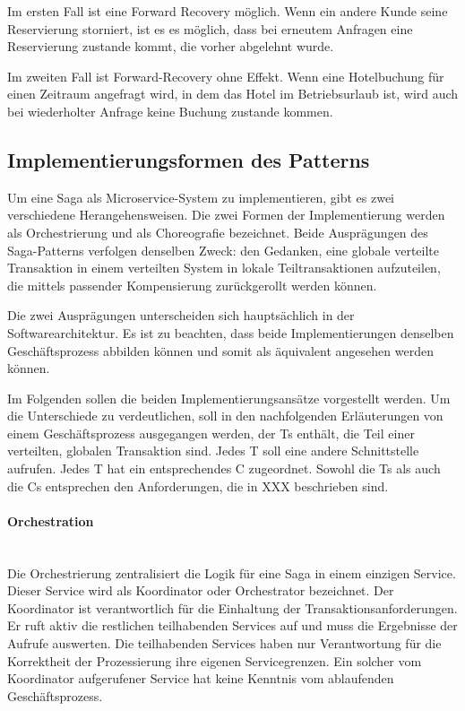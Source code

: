 Im ersten Fall ist eine Forward Recovery möglich. Wenn ein andere Kunde seine Reservierung storniert, ist es es möglich, dass bei erneutem Anfragen eine Reservierung zustande kommt, die vorher abgelehnt wurde.

Im zweiten Fall ist Forward-Recovery ohne Effekt. Wenn eine Hotelbuchung für einen Zeitraum angefragt wird, in dem das Hotel im Betriebsurlaub ist, wird auch bei wiederholter Anfrage keine Buchung zustande kommen.

\subsection{Implementierungsformen des Patterns}\label{subs_Saga_Implementierungsformen}
Um eine Saga als Microservice-System zu implementieren, gibt es zwei verschiedene Herangehensweisen. Die zwei Formen der Implementierung werden als Orchestrierung und als Choreografie bezeichnet. Beide Ausprägungen des Saga-Patterns verfolgen denselben Zweck: den Gedanken, eine globale verteilte Transaktion in einem verteilten System in lokale Teiltransaktionen aufzuteilen, die mittels passender Kompensierung zurückgerollt werden können. 

Die zwei Ausprägungen unterscheiden sich hauptsächlich in der Softwarearchitektur. Es ist zu beachten, dass beide Implementierungen denselben Geschäftsprozess abbilden können und somit als äquivalent angesehen werden können. %

Im Folgenden sollen die beiden Implementierungsansätze vorgestellt werden. Um die Unterschiede zu verdeutlichen, soll in den nachfolgenden Erläuterungen von einem Geschäftsprozess ausgegangen werden, der Ts enthält, die Teil einer verteilten, globalen Transaktion sind. Jedes T soll eine andere Schnittstelle aufrufen. Jedes T hat ein entsprechendes C zugeordnet. Sowohl die Ts als auch die Cs entsprechen den Anforderungen, die in XXX beschrieben sind. %

\paragraph*{Orchestration} \mbox{}\\
Die Orchestrierung zentralisiert die Logik für eine Saga in einem einzigen Service. Dieser Service wird als Koordinator oder Orchestrator bezeichnet. Der Koordinator ist verantwortlich für die Einhaltung der Transaktionsanforderungen. Er ruft aktiv die restlichen teilhabenden Services auf und muss die Ergebnisse der Aufrufe auswerten. Die teilhabenden Services haben nur Verantwortung für die Korrektheit der Prozessierung ihre eigenen Servicegrenzen. Ein solcher vom Koordinator aufgerufener Service hat keine Kenntnis vom ablaufenden Geschäftsprozess. 

